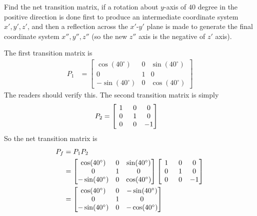 \begin{exmp}
Find the net transition matrix, if a rotation about $y$-axis of $40$ degree in the positive direction is done first to produce an intermediate coordinate system $x', y', z'$, and then a reflection across the $x'$-$y'$ plane is made to generate the final coordinate system $x'', y'', z''$ (so the new $z''$ axis is the negative of $z'$ axis).
\end{exmp}
\begin{solution}
The first transition matrix is
\begin{align*}
P_1
&= 
\begin{bmatrix}
\cos(40^\circ) & 0 & \sin(40^\circ) \\
0 & 1 & 0 \\
-\sin(40^\circ) & 0 & \cos(40^\circ)
\end{bmatrix}
\end{align*}
The readers should verify this. The second transition matrix is simply
\begin{align*}
P_2
&= 
\left[\begin{array}{@{\,}wc{10pt}wc{10pt}wc{10pt}@{\,}}
1 & 0 & 0 \\
0 & 1 & 0 \\
0 & 0 & -1
\end{array}\right]    
\end{align*}
So the net transition matrix is
\begin{align*}
P_f &= P_1P_2 \\
&= 
\begin{bmatrix}
\cos(40^\circ) & 0 & \sin(40^\circ) \\
0 & 1 & 0 \\
-\sin(40^\circ) & 0 & \cos(40^\circ)
\end{bmatrix}
\left[\begin{array}{@{\,}wc{10pt}wc{10pt}wc{10pt}@{\,}}
1 & 0 & 0 \\
0 & 1 & 0 \\
0 & 0 & -1
\end{array}\right] \\
&= 
\begin{bmatrix}
\cos(40^\circ) & 0 & -\sin(40^\circ) \\
0 & 1 & 0 \\
-\sin(40^\circ) & 0 & -\cos(40^\circ)
\end{bmatrix}
\end{align*}
\end{solution}
